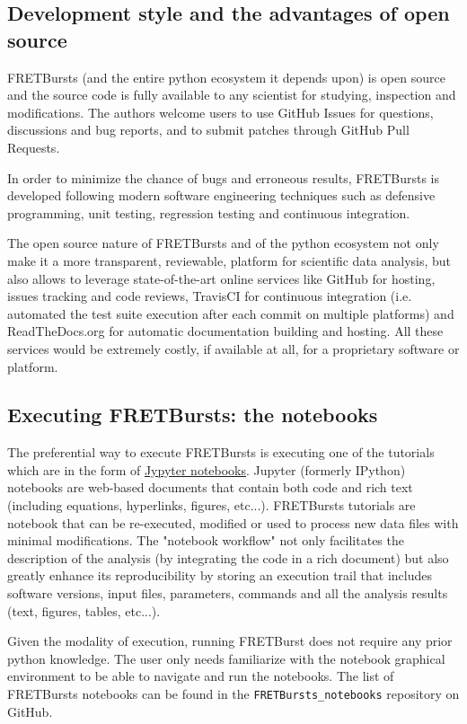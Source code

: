 \subsection{Development style and the advantages of open source}

FRETBursts (and the entire python ecosystem it depends upon) is open source 
and the source code is fully available to any scientist for studying, 
inspection and modifications.
The authors welcome users to use GitHub Issues for questions, discussions
and bug reports, and to submit patches through GitHub Pull Requests.

In order to minimize the chance of bugs and erroneous results, FRETBursts is developed
following modern software engineering techniques such 
as defensive programming, unit testing, regression testing and continuous integration.

The open source nature of FRETBursts and of the python ecosystem 
not only make it a more transparent, reviewable, platform 
for scientific data analysis, but also allows 
to leverage state-of-the-art online services like GitHub for hosting, issues tracking and code 
reviews, TravisCI for continuous integration (i.e. automated the test suite execution after 
each commit on multiple platforms) 
and ReadTheDocs.org for automatic documentation building and hosting. 
All these services would be extremely costly, if available at all, 
for a proprietary software or platform.

\subsection{Executing FRETBursts: the notebooks}

The preferential way to execute FRETBursts is executing one of the tutorials 
which are in the form of \href{http://ipython.org/notebook.html}{Jypyter notebooks}.
Jupyter (formerly IPython) notebooks are web-based documents that contain both 
code and rich text (including equations, hyperlinks, figures, etc...).
FRETBursts tutorials are notebook that can be re-executed,
modified or used to process new data files with minimal modifications.
The "notebook workflow"\cite{Shen_2014} not only facilitates 
the description of the analysis (by integrating the code in a rich document)
but also greatly enhance its reproducibility by storing an execution trail
that includes software versions, input files, parameters, commands and all
the analysis results (text, figures, tables, etc...).

Given the modality of execution, running FRETBurst does not require
any prior python knowledge. The user only needs familiarize with the
notebook graphical environment to be able to navigate and run the notebooks.
The list of FRETBursts notebooks can be found in the 
\verb|FRETBursts_notebooks| repository on GitHub.

